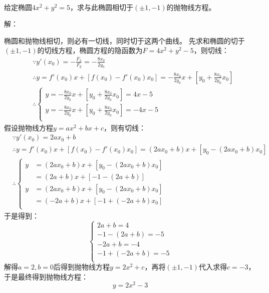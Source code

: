 ~

\begin{exercise}
给定椭圆$4x^2+y^2=5$，求与此椭圆相切于$\left( \pm 1,-1 \right) $的抛物线方程。
\end{exercise}

解：

椭圆和抛物线相切，则必有一切线，同时切于这两个曲线。
先求和椭圆的切于$\left( \pm 1,-1 \right) $的切线方程，椭圆方程的隐函数为$F=4x^2+y^2-5$，则切线：
\begin{align*}
&\because y'\left( x_0 \right) =-\frac{F_x}{F_y}=-\frac{8x_0}{2y_0} \\
&\therefore y=f'\left( x_0 \right) x+\left[ f\left( x_0 \right) -f'\left( x_0 \right) x_0 \right] =-\frac{8x_0}{2y_0}x+\left[ y_0+\frac{8x_0}{2y_0}x_0 \right] \\
&\therefore \begin{cases}
	y=-\frac{8x_0}{2y_0}x+\left[ y_0+\frac{8x_0}{2y_0}x_0 \right] =4x-5\\
	y=-\frac{8x_0}{2y_0}x+\left[ y_0+\frac{8x_0}{2y_0}x_0 \right] =-4x-5\\
\end{cases}
\end{align*}
假设抛物线方程$y=ax^2+bx+c$，则有切线：
\begin{align*}
&\because y'\left( x_0 \right) =2ax_0+b \\
&\therefore y=f'\left( x_0 \right) x+\left[ f\left( x_0 \right) -f'\left( x_0 \right) x_0 \right] =\left( 2ax_0+b \right) x+\left[ y_0-\left( 2ax_0+b \right) x_0 \right] \\
&\therefore \left\{ \begin{aligned}
	y&=\left( 2ax_0+b \right) x+\left[ y_0-\left( 2ax_0+b \right) x_0 \right]\\
	&=\left( 2a+b \right) x+\left[ -1-\left( 2a+b \right) \right]\\
	y&=\left( 2ax_0+b \right) x+\left[ y_0-\left( 2ax_0+b \right) x_0 \right]\\
	&=\left( -2a+b \right) x+\left[ -1+\left( -2a+b \right) x_0 \right]\\
\end{aligned} \right.
\end{align*}
于是得到：
\[
\begin{cases}
	2a+b=4\\
	-1-\left( 2a+b \right) =-5\\
	-2a+b=-4\\
	-1+\left( -2a+b \right) =-5\\
\end{cases}
\]
解得$a=2,b=0$后得到抛物线方程$y=2x^2+c$，再将$\left( \pm 1,-1 \right) $代入求得$c=-3$，于是最终得到抛物线方程：
\[
y=2x^2-3
\]


